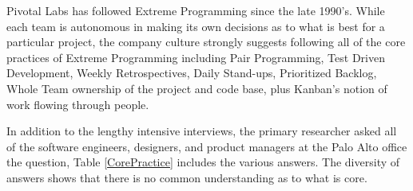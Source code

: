 Pivotal Labs has followed Extreme Programming \cite{ExtremeProgramming2004} since the late 1990's. While each team is autonomous in making its own decisions as to what is best for a particular project, the company culture strongly suggests following all of the core practices of Extreme Programming including Pair Programming, Test Driven Development, Weekly Retrospectives, Daily Stand-ups, Prioritized Backlog, Whole Team ownership of the project and code base, plus Kanban's notion of work flowing through people.

In addition to the lengthy intensive interviews, the primary researcher asked all of the software engineers, designers, and product managers at the Palo Alto office the question,  Table \ref{CorePractice} includes the various answers. The diversity of answers shows that there is no common understanding as to what is core. 

